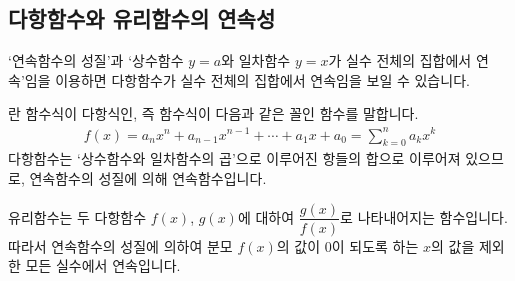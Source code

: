 \subsection{다항함수와 유리함수의 연속성}
`연속함수의 성질'과 `상수함수 $y=a$와 일차함수 $y=x$가 실수 전체의 집합에서 연속'임을 이용하면 다항함수가 실수 전체의 집합에서 연속임을 보일 수 있습니다.

란 함수식이 다항식인, 즉 함수식이 다음과 같은 꼴인 함수를 말합니다.
\begin{align*} f\left( x \right) = a_n x^n + a_{n-1}x^{n-1} + \cdots + a_1 x + a_0 = \sum_{k=0}^{n}a_k x^k\end{align*}
다항함수는 `상수함수와 일차함수의 곱'으로 이루어진 항들의 합으로 이루어져 있으므로, 연속함수의 성질에 의해 연속함수입니다.

유리함수는 두 다항함수 $f\left( x \right) $, $g\left( x \right) $에 대하여 $\dfrac{g\left( x \right) }{f\left( x \right) }$로 나타내어지는 함수입니다. 따라서 연속함수의 성질에 의하여 분모 $f\left( x \right) $의 값이 $0$이 되도록 하는 $x$의 값을 제외한 모든 실수에서 연속입니다.
\clearpage
